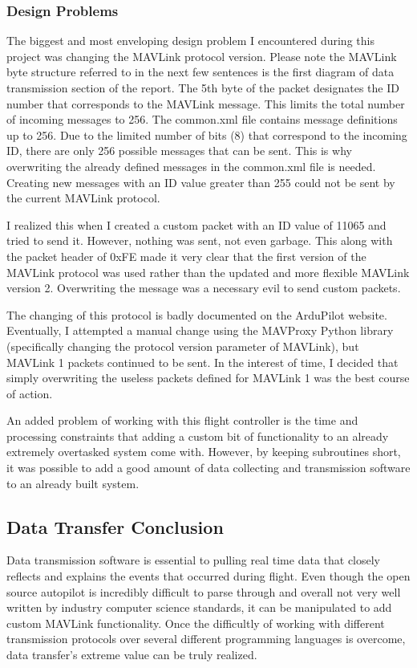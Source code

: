 \documentclass[12pt,journal,compsoc]{IEEEtran}
\begin{document}
\subsubsection{Design Problems}
The biggest and most enveloping design problem I encountered during this project was changing the MAVLink protocol version. Please note the MAVLink byte structure referred to in the next few sentences is the first diagram of data transmission section of the report. The 5th byte of the packet designates the ID number that corresponds to the MAVLink message. This limits the total number of incoming messages to 256. The common.xml file contains message definitions up to 256. Due to the limited number of bits (8) that correspond to the incoming ID, there are only 256 possible messages that can be sent. This is why overwriting the already defined messages in the common.xml file is needed. Creating new messages with an ID value greater than 255 could not be sent by the current MAVLink protocol.

I realized this when I created a custom packet with an ID value of 11065 and tried to send it. However, nothing was sent, not even garbage. This along with the packet header of 0xFE made it very clear that the first version of the MAVLink protocol was used rather than the updated and more flexible MAVLink version 2. Overwriting the message was a necessary evil to send custom packets. 

The changing of this protocol is badly documented on the ArduPilot website. Eventually, I attempted a manual change using the MAVProxy Python library (specifically changing the protocol version parameter of MAVLink), but MAVLink 1 packets continued to be sent. In the interest of time, I decided that simply overwriting the useless packets defined for MAVLink 1 was the best course of action.

An added problem of working with this flight controller is the time and processing constraints that adding a custom bit of functionality to an already extremely overtasked system come with. However, by keeping subroutines short, it was possible to add a good amount of data collecting and transmission software to an already built system.

\subsection{Data Transfer Conclusion}
Data transmission software is essential to pulling real time data that closely reflects and explains the events that occurred during flight. Even though the open source autopilot is incredibly difficult to parse through and overall not very well written by industry computer science standards, it can be manipulated to add custom MAVLink functionality. Once the difficultly of working with different transmission protocols over several different programming languages is overcome, data transfer's extreme value can be truly realized. 
\end{document}
